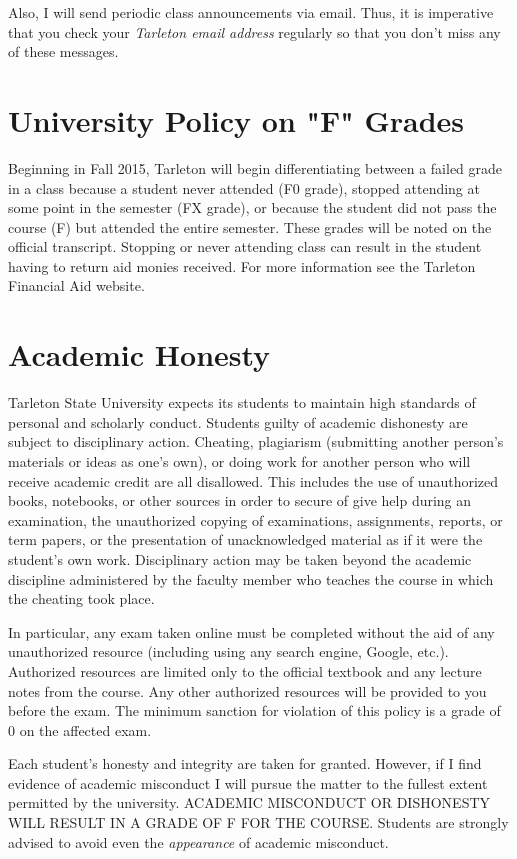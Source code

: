 \documentclass[10pt]{article}
\begin{document}
Also, I will send periodic class announcements via email.  Thus, it is imperative that you check your \emph{Tarleton email address} regularly so that you don't miss any of these messages.

\section*{University Policy on "F" Grades}
\label{sec:org768f9e7}
Beginning in Fall 2015, Tarleton will begin differentiating between a failed grade in a class because a student never attended (F0 grade), stopped attending at some point in the semester (FX grade), or because the student did not pass the course (F) but attended the entire semester. These grades will be noted on the official transcript. Stopping or never attending class can result in the student having to return aid monies received.  For more information see the Tarleton Financial Aid website.

\section*{Academic Honesty}
\label{sec:org3ba2444}

Tarleton State University expects its students to maintain high standards of personal and scholarly conduct. Students guilty of academic dishonesty are subject to disciplinary action. Cheating, plagiarism (submitting another person’s materials or ideas as one’s own), or doing work for another person who will receive academic credit are all disallowed. This includes the use of unauthorized books, notebooks, or other sources in order to secure of give help during an examination, the unauthorized copying of examinations, assignments, reports, or term papers, or the presentation of unacknowledged material as if it were the student’s own work. Disciplinary action may be taken beyond the academic discipline administered by the faculty member who teaches the course in which the cheating took place.

In particular, any exam taken online must be completed without the aid of any unauthorized resource (including using any search engine, Google, etc.).  Authorized resources are limited only to the official textbook and any lecture notes from the course.  Any other authorized resources will be provided to you before the exam.  The minimum sanction for violation of this policy is a grade of 0 on the affected exam.

Each student’s honesty and integrity are taken for granted. However, if I find evidence of academic misconduct I will pursue the matter to the fullest extent permitted by the university. ACADEMIC MISCONDUCT OR DISHONESTY WILL RESULT IN A GRADE OF F FOR THE COURSE.  Students are strongly advised to avoid even the \emph{appearance} of academic misconduct. 
\end{document}
